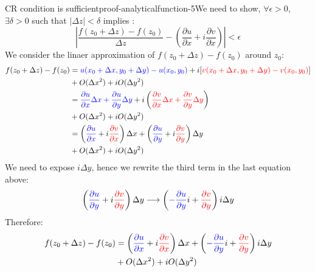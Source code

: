 \begin{mystthmproof}{CR condition is sufficient}{proof-analyticalfunction-5}We need to show, $\forall \epsilon >0$,  $\exists \delta >0$ such that $|\Delta z|<\delta$ implies :
\begin{equation}
\left| \frac{f(z_0+\Delta z)-f(z_0)}{\Delta z} - \left(\frac{\partial u}{\partial x} + i\frac{\partial v}{\partial x}\right) \right| < \epsilon
\end{equation}
We consider the linaer approximation of $f(z_0+\Delta z) -f(z_0)$ around $z_0$:
\begin{equation}
\begin{aligned}
f(z_0+\Delta z)-f(z_0)&=\textcolor{blue}{u(x_0+\Delta x,y_0+\Delta y)-u(x_0,y_0)} + i[\textcolor{red}{v(x_0+\Delta x, y_0+\Delta y)-v(x_0,y_0)}]
\\ &+ O(\Delta x^2) + iO(\Delta y^2) \\
&= \textcolor{blue}{\frac{\partial u}{\partial x}\Delta x +\frac{\partial u}{\partial y} \Delta y} +i\left(\textcolor{red}{\frac{\partial v}{\partial x}\Delta x +\frac{\partial v}{\partial y}\Delta y} \right) \\ &+ O(\Delta x^2)+iO(\Delta y^2) \\
&= \left(\textcolor{blue}{\frac{\partial u}{\partial x}}+i\textcolor{red}{\frac{\partial v}{\partial x}}\right)\Delta x+\left(\textcolor{blue}{\frac{\partial u}{\partial y}} + i\textcolor{red}{\frac{\partial v}{\partial y}}\right)\Delta y\\ &+ O(\Delta x^2)+iO(\Delta y^2) \\
\end{aligned}
\end{equation}
We need to expose $i\Delta y$, hence we rewrite the third term in the last equation above:
\begin{equation}
\left(\textcolor{blue}{\frac{\partial u}{\partial y}} + i\textcolor{red}{\frac{\partial v}{\partial y}}\right)\Delta y \longrightarrow \left(\textcolor{blue}{-\frac{\partial u}{\partial y}}i + \textcolor{red}{\frac{\partial v}{\partial y}}\right)i\Delta y
\end{equation}
Therefore:
\begin{equation}
\begin{aligned}
f(z_0+\Delta z)-f(z_0) &=  \left(\textcolor{blue}{\frac{\partial u}{\partial x}}+i\textcolor{red}{\frac{\partial v}{\partial x}}\right)\Delta x+\left(\textcolor{blue}{-\frac{\partial u}{\partial y}}i + \textcolor{red}{\frac{\partial v}{\partial y}}\right)i\Delta y\\ &+ O(\Delta x^2)+iO(\Delta y^2)

\end{aligned}
\end{equation}
\end{mystthmproof}
